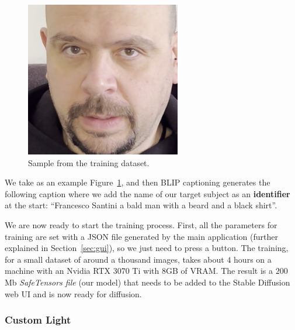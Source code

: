 \documentclass[preprint]{elsarticle}
\begin{document}
\begin{figure}[t]
	\centering
	\includegraphics[scale=0.3, keepaspectratio]{img/project_img/santini-training.png}
	\caption{Sample from the training dataset.}
	\label{fig:santini-training}
\end{figure}


We take as an example Figure~\ref{fig:santini-training}, and then BLIP captioning generates the following caption where we add the name of our target subject as an \textbf{identifier} at the start: ``Francesco Santini a bald man with a beard and a black shirt''.

We are now ready to start the training process.  First, all the parameters for training are set with a JSON file generated by the main application (further explained in Section~\ref{sec:gui}), so we just need to press a button. The training, for a small dataset of around a thousand images, 
takes about $4$ hours on a machine with an Nvidia RTX 3070 Ti with $8$GB of VRAM.  The result is a $200$Mb \emph{SafeTensors file} (our model) that needs to be added to the Stable Diffusion web UI and is now ready for diffusion.

\subsubsection{Custom Light}
\end{document}

